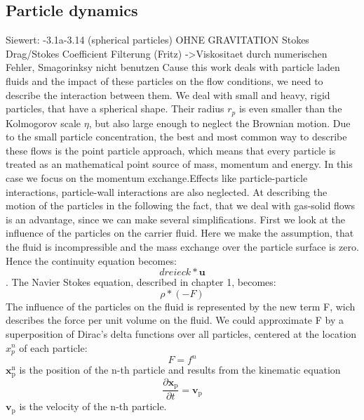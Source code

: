 \documentclass[a4paper,12pt]{article}
\renewcommand*\vec[1]{\boldsymbol{#1}}
\numberwithin{equation}{section} %
\begin{document}
\subsection{Particle dynamics} %
Siewert:
-3.1a-3.14 (spherical particles) OHNE GRAVITATION
Stokes Drag/Stokes Coefficient
Filterung (Fritz) ->Viskositaet durch numerischen Fehler, Smagorinksy nicht benutzen
\newline
\newline
Cause this work deals with particle laden fluids and the impact of these particles on the flow conditions, we need to describe the interaction between them. 
We deal with small and heavy, rigid particles, that have a spherical shape. Their radius $ r_p $ is even smaller than the Kolmogorov scale $ \eta $, but also large enough to neglect the Brownian motion.
Due to the small particle concentration, the best and most common way to describe these flows is the point particle approach, which means that every particle is treated as an mathematical point source of mass, momentum and energy. In this case we focus on the momentum exchange.Effects like particle-particle interactions, particle-wall interactions are also neglected.  
At describing the motion of the particles in the following the fact, that we deal with gas-solid flows is an advantage, since we can make several simplifications.
First we look at the influence of the particles on the carrier fluid. Here we make the assumption, that the fluid is incompressible and the mass exchange over the particle surface is zero.
Hence the continuity equation becomes:
\begin{equation}
dreieck * \vec{u}
\end{equation}.
The Navier Stokes equation, described in chapter 1, becomes:
\begin{equation}
\rho*(-F)
\end{equation}
The influence of the particles on the fluid is represented by the new term F, wich describes the force per unit volume on the fluid.
We could approximate F by a superposition of Dirac's delta functions over all particles, centered at the location $x_p^n$ of each particle:
\begin{equation}
F = f^n
\end{equation}
$\vec{x_\mathrm{p}^\mathrm{n}} $ is the position of the n-th particle and results from the kinematic equation 
\begin{equation}
 \frac{\partial{\vec{x_\mathrm{p}}}}{\partial{t}} = \vec{v_\mathrm{p}}
\end{equation}
$\vec{v_\mathrm{p}}$ is the velocity of the n-th particle.
\end{document}
